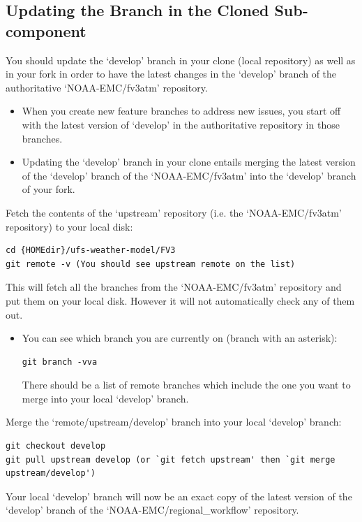 \documentclass[11pt,fleqn]{report}              %
\begin{document}
\subsection{Updating the Branch in the Cloned Sub-component}

You should update the `develop' branch in your clone (local repository) as well as in your fork in order to have the latest changes in the `develop' branch of the authoritative `NOAA-EMC/fv3atm' repository.

\begin{itemize}
\item When you create new feature branches to address new issues, you start off with the latest version of `develop' in the authoritative repository in those branches.
\item Updating the `develop' branch in your clone entails merging the latest version of the `develop' branch of the `NOAA-EMC/fv3atm' into the `develop' branch of your fork.
\end{itemize}

Fetch the contents of the `upstream' repository (i.e. the `NOAA-EMC/fv3atm' repository) to your local disk:

\lstset{language=bash}   
\begin{lstlisting}[frame=trBL]
cd {HOMEdir}/ufs-weather-model/FV3
git remote -v (You should see upstream remote on the list)
\end{lstlisting}

This will fetch all the branches from the `NOAA-EMC/fv3atm' repository and put them on your local disk. However it will not automatically check any of them out.
\begin{itemize}
\item You can see which branch you are currently on (branch with an asterisk):
\lstset{language=bash}   
\begin{lstlisting}[frame=trBL]
git branch -vva
\end{lstlisting}
There should be a list of remote branches which include the one you want to merge into your local `develop' branch.
\end{itemize}

Merge the `remote/upstream/develop' branch into your local `develop' branch:
\lstset{language=bash}   
\begin{lstlisting}[frame=trBL]
git checkout develop
git pull upstream develop (or `git fetch upstream' then `git merge upstream/develop')
\end{lstlisting}
Your local `develop' branch will now be an exact copy of the latest version of the `develop' branch of the `NOAA-EMC/regional\_workflow' repository.
\end{document}
